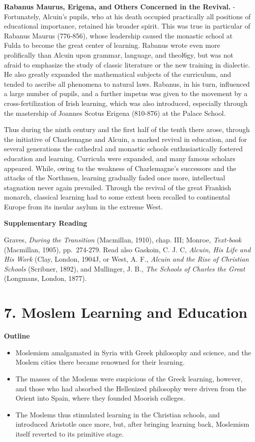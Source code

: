 \documentclass[]{book}
\providecommand{\tightlist}{%
  \setlength{\itemsep}{0pt}\setlength{\parskip}{0pt}}
\begin{document}
\textbf{Rabanus Maurus, Erigena, and Others Concerned in the Revival.} - Fortunately, Alcuin's pupils, who at his death occupied practically all positions of educational importance, retained his broader spirit. This was true in particular of Rabanus Maurus (776-856), whose leadership caused the monastic school at Fulda to become the great center of learning. Rabanus wrote even more prolifically than Alcuin upon grammar, language, and theol6gy, but was not afraid to emphasize the study of classic literature or the new training in dialectic. He also greatly expanded the mathematical subjects of the curriculum, and tended to ascribe all phenomena to natural laws. Rabanus, in his turn, influenced a large number of pupils, and a further impetus was given to the movement by a cross-fertilization of Irish learning, which was also introduced, especially through the mastership of Joannes Scotus Erigena (810-876) at the Palace School.

Thus during the ninth century and the first half of the tenth there arose, through the initiative of Charlemagne and Alcuin, a marked revival in education, and for several generations the cathedral and monastic schools enthusiastically fostered education and learning. Curricula were expanded, and many famous scholars appeared. While, owing to the weakness of Charlemagne's successors and the attacks of the Northmen, learning gradually faded once more, intellectual stagnation never again prevailed. Through the revival of the great Frankish monarch, classical learning had to some extent been recalled to continental Europe from its insular asylum in the extreme West.

\textbf{Supplementary Reading}

Graves, \emph{During the Transition} (Macmillan, 1910), chap. III; Monroe, \emph{Text-book} (Macmillan, 1905), pp.~274-279. Read also Gaskoin, C. J. C, \emph{Alcuin, His Life and His Work} (Clay, London, 1904J, or West, A. F., \emph{Alcuin and the Rise of Christian Schools} (Scribner, 1892), and Mullinger, J. B., \emph{The Schools of Charles the Great} (Longmans, London, 1877).

\hypertarget{moslem-learning-and-education}{%
\chapter{7. Moslem Learning and Education}\label{moslem-learning-and-education}}

\textbf{Outline}

\begin{itemize}
\tightlist
\item
  Moslemism amalgamated in Syria with Greek philosophy and science, and the Moslem cities there became renowned for their learning.
\item
  The masses of the Moslems were suspicious of the Greek learning, however, and those who had absorbed the Hellenized philosophy were driven from the Orient into Spain, where they founded Moorish colleges.
\item
  The Moslems thus stimulated learning in the Christian schools, and introduced Aristotle once more, but, after bringing learning back, Moslemism itself reverted to its primitive stage.
\end{itemize}
\end{document}
